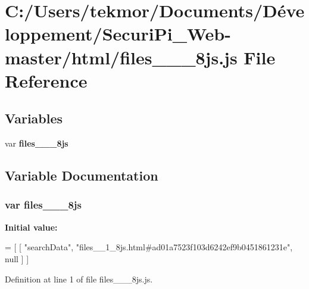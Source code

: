 \section{C\+:/\+Users/tekmor/\+Documents/\+Développement/\+Securi\+Pi\+\_\+\+Web-\/master/html/files\+\_\+\+\_\+\_\+8js.js File Reference}
\label{files____1__8js_8js}
\subsection*{Variables}
\begin{DoxyCompactItemize}
\item 
var {\bf files\+\_\+\+\_\+\_\+8js}
\end{DoxyCompactItemize}


\subsection{Variable Documentation}
\subsubsection[{files\+\_\+\+\_\+1\+\_\+8js}]{\setlength{\rightskip}{0pt plus 5cm}var files\+\_\+\+\_\+\_\+8js}\label{files____1__8js_8js_a734a295e49f740db4b65a071276ed568}
{\bfseries Initial value\+:}
\begin{DoxyCode}
=
[
    [ \textcolor{stringliteral}{"searchData"}, \textcolor{stringliteral}{"files\_\_1\_8js.html#ad01a7523f103d6242ef9b0451861231e"}, null ]
]
\end{DoxyCode}


Definition at line 1 of file files\+\_\+\+\_\+\_\+8js.\+js.

